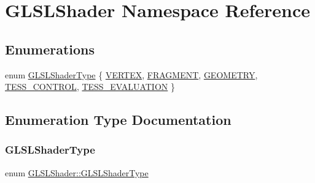\hypertarget{namespace_g_l_s_l_shader}{}\section{G\+L\+S\+L\+Shader Namespace Reference}
\label{namespace_g_l_s_l_shader}
\subsection*{Enumerations}
\begin{DoxyCompactItemize}
\item 
enum \hyperlink{namespace_g_l_s_l_shader_a5da03bdfde28d414fcf090182b3b8177}{G\+L\+S\+L\+Shader\+Type} \{ \newline
\hyperlink{namespace_g_l_s_l_shader_a5da03bdfde28d414fcf090182b3b8177ab6ad7c104ea857f145384005110a1c6e}{V\+E\+R\+T\+EX}, 
\hyperlink{namespace_g_l_s_l_shader_a5da03bdfde28d414fcf090182b3b8177a85031a5a60d6ee9c4adbb3b28b85946e}{F\+R\+A\+G\+M\+E\+NT}, 
\hyperlink{namespace_g_l_s_l_shader_a5da03bdfde28d414fcf090182b3b8177a6aaa8667eec47f0f967e7082c23fcdcc}{G\+E\+O\+M\+E\+T\+RY}, 
\hyperlink{namespace_g_l_s_l_shader_a5da03bdfde28d414fcf090182b3b8177a82c6bbf24e589498e119365b252e4dcc}{T\+E\+S\+S\+\_\+\+C\+O\+N\+T\+R\+OL}, 
\newline
\hyperlink{namespace_g_l_s_l_shader_a5da03bdfde28d414fcf090182b3b8177a2789dee13d030cfc5c6559b6de9e1767}{T\+E\+S\+S\+\_\+\+E\+V\+A\+L\+U\+A\+T\+I\+ON}
 \}
\end{DoxyCompactItemize}


\subsection{Enumeration Type Documentation}
\hypertarget{namespace_g_l_s_l_shader_a5da03bdfde28d414fcf090182b3b8177}{}\label{namespace_g_l_s_l_shader_a5da03bdfde28d414fcf090182b3b8177} 
\subsubsection{\texorpdfstring{G\+L\+S\+L\+Shader\+Type}{GLSLShaderType}}
{\footnotesize\ttfamily enum \hyperlink{namespace_g_l_s_l_shader_a5da03bdfde28d414fcf090182b3b8177}{G\+L\+S\+L\+Shader\+::\+G\+L\+S\+L\+Shader\+Type}}

